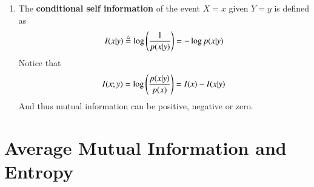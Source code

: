 \documentclass[journal,12pt,twocolumn]{IEEEtran}
\renewcommand\thesection{\arabic{section}}
\begin{document}
\begin{enumerate}[label=\thesection.\arabic*, ref=\thesection.\theenumi]
    \item The \textbf{conditional self information} of the event $X = x$ given 
    $Y = y$ is defined as
    \begin{align}
        I(x|y) \stackrel{\triangle}{=} \log\left(\frac{1}{p(x|y)}\right) = -\log p(x|y)
        \label{eq:conditional-self-info}
    \end{align}
    Notice that
    \begin{align}
        I(x;y) = \log\left(\frac{p(x|y)}{p(x)}\right) = I(x) - I(x|y)
        \label{eq:cond-mutual-self-info}
    \end{align}
    And thus mutual information can be positive, negative or zero.
\end{enumerate}

\section{Average Mutual Information and Entropy}
\end{document}
